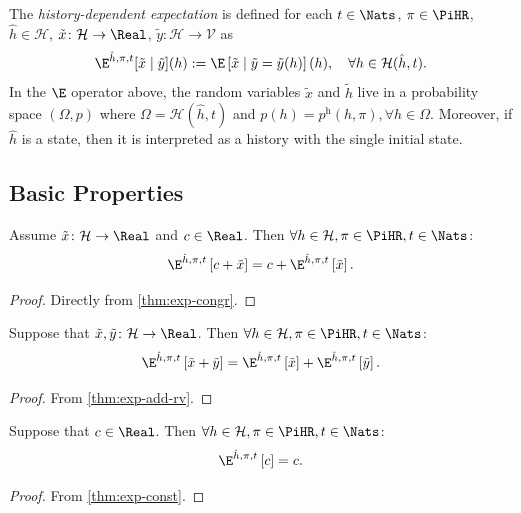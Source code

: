 \begin{definition}\label{def:expect-h-cnd-rv}
The \emph{history-dependent expectation} is defined for each $t\in \Nats$, $\pi\in \PiHR$, $\hat{h}\in \mathcal{H}$, $\tilde{x}\colon \mathcal{H} \to \Real$, $\tilde{y}\colon \mathcal{H} \to \mathcal{\mathcal{V}}$ as
\begin{equation*}
\E^{\hat{h}, \pi, t} [\tilde{x} \mid \tilde{y} ](h)
:= \E \left[ \tilde{x} \mid \tilde{y} = \tilde{y}(h) \right](h), \quad\forall h\in \mathcal{H}(\hat{h}, t).
\end{equation*}
In the $\E$ operator above, the random variables $\tilde{x}$ and $\tilde{h}$ live in a probability space $(\Omega, p)$ where $\Omega = \mathcal{H}(\hat{h}, t)$ and $p(h) = p^{\mathrm{h}}(h, \pi), \forall h\in \Omega$.
Moreover, if $\hat{h}$ is a state, then it is interpreted as a history with the single initial state.
\end{definition}


\subsection{Basic Properties}


\begin{theorem} \label{thm:exph-congr}
Assume $\tilde{x} \colon \mathcal{H} \to \Real$ and $c \in \Real$. Then $\forall h\in \mathcal{H}, \pi\in \PiHR, t \in \Nats$:
\[
  \E^{\hat{h}, \pi, t} \left[ c + \tilde{x} \right]
  =
  c + \E^{\hat{h}, \pi, t} \left[ \tilde{x} \right].
\]
\end{theorem}
\begin{proof}
Directly from \cref{thm:exp-congr}. 
\end{proof}

\begin{theorem} \label{thm:exph-add-rv}
Suppose that $\tilde{x}, \tilde{y} \colon \mathcal{H} \to \Real $. Then $\forall h\in \mathcal{H}, \pi\in \PiHR, t \in \Nats$:
\[
  \E^{\hat{h}, \pi, t} \left[ \tilde{x} + \tilde{y} \right]
  =
  \E^{\hat{h}, \pi, t} \left[ \tilde{x} \right] + \E^{\hat{h}, \pi, t} \left[ \tilde{y} \right].
\]
\end{theorem}
\begin{proof}
  From \cref{thm:exp-add-rv}.
\end{proof}

\begin{theorem} \label{thm:exph-const}
Suppose that $c\in \Real$. Then $\forall h\in \mathcal{H}, \pi\in \PiHR, t \in \Nats$:
\[
  \E^{\hat{h}, \pi, t} \left[ c \right] = c.
\]
\end{theorem}
\begin{proof}
  From \cref{thm:exp-const}.
\end{proof}

